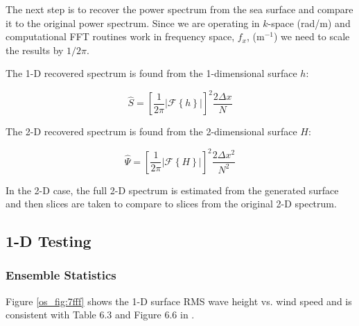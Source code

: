 The next step is to recover the power spectrum from the sea surface and compare it to the original power spectrum. Since we are operating in $k$-space (rad/m) and computational FFT routines work in frequency space, $f_x$, (m$^{-1}$) we need to scale the results by $1/2\pi$. 

The 1-D recovered spectrum is found from the 1-dimensional surface $h$:

\begin{equation}
\label{os_eq:ab}
\hat{S} = \left[\frac{1}{2\pi}\left|\mathcal{F}\left\{ h\right\} \right| \right]^2\frac{2 \Delta x}{N}
\end{equation}
\renewcommand{\baselinestretch}{2} \small\normalsize

The 2-D recovered spectrum is found from the 2-dimensional surface $H$:

\begin{equation}
\label{os_eq:ba}
\hat{\Psi} = \left[\frac{1}{2\pi}\left|\mathcal{F}\left\{ H\right\} \right| \right]^2\frac{2 \Delta x^2}{N^2}
\end{equation}
\renewcommand{\baselinestretch}{2} \small\normalsize

In the 2-D case, the full 2-D spectrum is estimated from the generated surface and then slices are taken to compare to slices from the original 2-D spectrum. 

\subsection {1-D Testing}
\subsubsection {Ensemble Statistics}
Figure \ref{os_fig:7fff} shows the 1-D surface RMS wave height vs. wind speed and is consistent with Table 6.3 and Figure 6.6 in \cite{temper_guide}.

